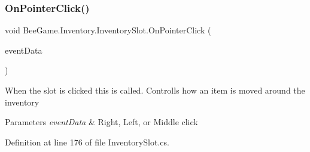 \subsubsection{\texorpdfstring{On\+Pointer\+Click()}{OnPointerClick()}}
{\footnotesize\ttfamily void Bee\+Game.\+Inventory.\+Inventory\+Slot.\+On\+Pointer\+Click (\begin{DoxyParamCaption}\item[{Pointer\+Event\+Data}]{event\+Data }\end{DoxyParamCaption})}



When the slot is clicked this is called. Controlls how an item is moved around the inventory 


\begin{DoxyParams}{Parameters}
{\em event\+Data} & Right, Left, or Middle click\\
\hline
\end{DoxyParams}


Definition at line 176 of file Inventory\+Slot.\+cs.


